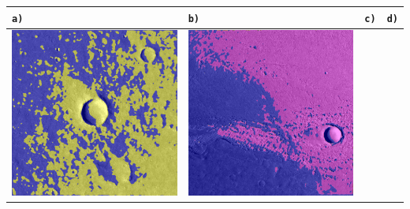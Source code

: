 \begin{table}[h!]
	\setlength\tabcolsep{0pt}
	\begin{tabularx}{\textwidth}{>{\centering}m{}
			>{\centering}m{}
			>{\centering}m{}
			>{\centering\arraybackslash}m{}}
		\toprule
		
		\texttt{a)} & 
		\texttt{b)} &
		\texttt{c)} &
		\texttt{d)} \\
		\midrule
		\includegraphics[width=0.9\linewidth]{images/gen/activation_functions/p03_01.png_leakyrelu.png} &
		\includegraphics[width=0.9\linewidth]{images/gen/activation_functions/p03_02.png_leakyrelu.png} &

\end{tabularx}
\end{table}
